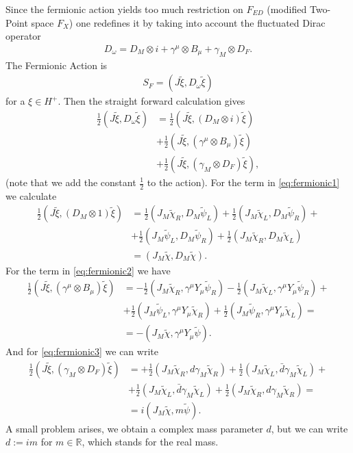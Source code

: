 Since the fermionic action yields too much restriction on $F_{ED}$ (modified
Two-Point space $F_X$) one redefines it by taking into account the fluctuated Dirac
operator
\begin{align}
    D_\omega = D_M \otimes i + \gamma^\mu \otimes B_\mu + \gamma_M \otimes
    D_F.
\end{align}
The Fermionic Action is
\begin{align}
S_F = (J\tilde{\xi}, D_\omega\tilde{\xi})
\end{align}
for a $\xi \in H^+$. Then the straight forward calculation gives \begin{align}
    \frac{1}{2}(J\tilde{\xi}, D_\omega\tilde{\xi})
        &=\frac{1}{2}(J\tilde{\xi}, (D_M \otimes
        i)\tilde{\xi})\label{eq:fermionic1}\\
        &+\frac{1}{2}(J\tilde{\xi}, (\gamma^\mu \otimes B_\mu)
        \tilde{\xi})\label{eq:fermionic2}\\
        &+\frac{1}{2}(J\tilde{\xi}, (\gamma_M\otimes
        D_F)\tilde{\xi})\label{eq:fermionic3},
\end{align}
(note that we add the constant $\frac{1}{2}$ to the action).
For the term in \eqref{eq:fermionic1} we calculate
\begin{align}
    \frac{1}{2}(J\tilde{\xi}, (D_M\otimes 1)\tilde{\xi}) &=
    \frac{1}{2}(J_M\tilde{\chi}_R,D_M\tilde{\psi}_L)+\nonumber
    \frac{1}{2}(J_M\tilde{\chi}_L,D_M\tilde{\psi}_R)+
    \\&+\frac{1}{2}(J_M\tilde{\psi}_L,D_M\tilde{\psi}_R)+\nonumber
    \frac{1}{2}(J_M\tilde{\chi}_R,D_M\tilde{\chi}_L)\\
    &= (J_M\tilde{\chi},D_M\tilde{\chi}).
\end{align}
For the term in \eqref{eq:fermionic2} we have
\begin{align}
    \frac{1}{2}(J\tilde{\xi}, (\gamma^\mu \otimes B_\mu)\tilde{\xi})&=
    -\frac{1}{2}(J_M\tilde{\chi}_R, \gamma^\mu Y_\mu\tilde{\psi}_R)
    -\frac{1}{2}(J_M\tilde{\chi}_L, \gamma^\mu Y_\mu\tilde{\psi}_R)+\nonumber\\
    &+\frac{1}{2}(J_M\tilde{\psi}_L, \gamma^\mu Y_\mu\tilde{\chi}_R)+
    \frac{1}{2}(J_M\tilde{\psi}_R, \gamma^\mu Y_\mu\tilde{\chi}_L)=\nonumber\\
    &= -(J_M\tilde{\chi}, \gamma^\mu Y_\mu\tilde{\psi}).
\end{align}
And for \eqref{eq:fermionic3} we can write
\begin{align}
    \frac{1}{2}(J\tilde{\xi}, (\gamma_M\otimes D_F)\tilde{\xi})&=
    +\frac{1}{2}(J_M\tilde{\chi}_R, d\gamma_M\tilde{\chi}_R)
    +\frac{1}{2}(J_M\tilde{\chi}_L, \bar{d}\gamma_M\tilde{\chi}_L)+\nonumber\\
    &+\frac{1}{2}(J_M\tilde{\chi}_L, \bar{d}\gamma_M\tilde{\chi}_L)
    +\frac{1}{2}(J_M\tilde{\chi}_R, d\gamma_M\tilde{\chi}_R)=\nonumber\\
    &= i(J_M\tilde{\chi}, m\tilde{\psi}).
\end{align}
A small problem arises, we obtain a complex mass parameter $d$, but we can
write $d:=im$ for $m\in \mathbb{R}$, which stands for the real mass.

